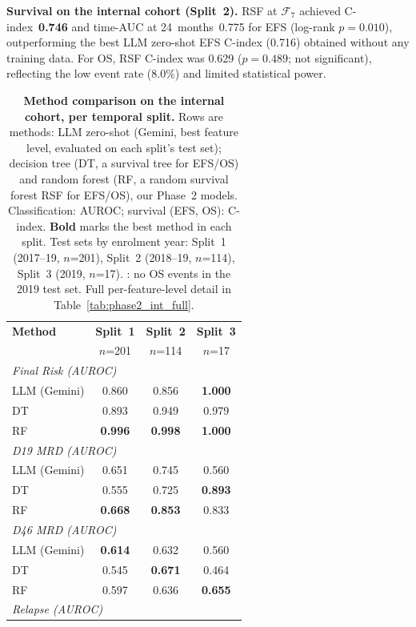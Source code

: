 \documentclass[pdflatex,sn-nature]{sn-jnl}
\begin{document}
\textbf{Survival on the internal cohort (Split~2).}
RSF at $\mathcal{F}_7$ achieved C-index~\textbf{0.746} and
time-AUC at 24~months~0.775 for EFS (log-rank $p=0.010$),
outperforming the best LLM zero-shot EFS C-index (0.716) obtained
without any training data.
For OS, RSF C-index was 0.629 ($p=0.489$; not significant), reflecting
the low event rate (8.0\%) and limited statistical power.

\begin{table}[t]
\caption{\textbf{Method comparison on the internal cohort, per temporal
split.} Rows are methods: LLM zero-shot (Gemini, best feature level,
evaluated on each split's test set); decision tree (DT, a survival tree
for EFS/OS) and random forest (RF, a random survival forest RSF for
EFS/OS), our Phase~2 models. Classification: AUROC; survival (EFS, OS):
C-index. \textbf{Bold}
marks the best method in each split. Test sets by enrolment year:
Split~1 (2017--19, $n$=201), Split~2 (2018--19, $n$=114), Split~3 (2019,
$n$=17). \textemdash{}: no OS events in the 2019 test set. Full
per-feature-level detail in Table~\ref{tab:phase2_int_full}.}
\label{tab:phase2_int}
\centering
\small
\setlength{\tabcolsep}{6pt}
\begin{tabular}{@{}l ccc@{}}
\toprule
\textbf{Method} & \textbf{Split~1} & \textbf{Split~2} & \textbf{Split~3} \\
 & \footnotesize $n$=201 & \footnotesize $n$=114 & \footnotesize $n$=17 \\
\midrule
\multicolumn{4}{l}{\textit{Final Risk (AUROC)}} \\
LLM (Gemini) & 0.860 & 0.856 & \textbf{1.000} \\
DT & 0.893 & 0.949 & 0.979 \\
RF & \textbf{0.996} & \textbf{0.998} & \textbf{1.000} \\
\multicolumn{4}{l}{\textit{D19 MRD (AUROC)}} \\
LLM (Gemini) & 0.651 & 0.745 & 0.560 \\
DT & 0.555 & 0.725 & \textbf{0.893} \\
RF & \textbf{0.668} & \textbf{0.853} & 0.833 \\
\multicolumn{4}{l}{\textit{D46 MRD (AUROC)}} \\
LLM (Gemini) & \textbf{0.614} & 0.632 & 0.560 \\
DT & 0.545 & \textbf{0.671} & 0.464 \\
RF & 0.597 & 0.636 & \textbf{0.655} \\
\multicolumn{4}{l}{\textit{Relapse (AUROC)}} \\

\end{tabular}
\end{table}
\end{document}
